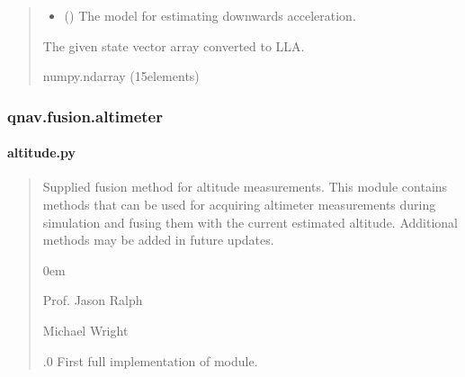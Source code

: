 \documentclass[letterpaper,10pt,english]{sphinxmanual}
\begin{document}
\begin{fulllineitems}
\begin{quote}
\begin{description}
\begin{itemize}
\item {} 
\sphinxAtStartPar
{} ({\hyperref[\detokenize{modules/gravity/base:qnav.gravity.base.GravityModel}]{}}) \textendash{} The model for estimating downwards acceleration.

\end{itemize}

\sphinxAtStartPar
The given state vector array converted to LLA.

\sphinxAtStartPar
numpy.ndarray (15\sphinxhyphen{}elements)

\end{description}\end{quote}

\end{fulllineitems}


\sphinxstepscope


\subsubsection{qnav.fusion.altimeter}
\label{\detokenize{modules/fusion/altimeter:module-qnav.fusion.altimeter}}\label{\detokenize{modules/fusion/altimeter:qnav-fusion-altimeter}}\label{\detokenize{modules/fusion/altimeter::doc}}

\paragraph{altitude.py}
\label{\detokenize{modules/fusion/altimeter:altitude-py}}\begin{quote}\begin{description}
\sphinxAtStartPar
Supplied fusion method for altitude measurements.
This module contains methods that can be used for acquiring altimeter
measurements during simulation and fusing them with the current
estimated altitude. Additional methods may be added in future updates.

\begin{DUlineblock}{0em}
\item[] Prof. Jason Ralph \sphinxhyphen{} 
\item[] Michael Wright \sphinxhyphen{} 
\end{DUlineblock}

.0 \sphinxhyphen{} First full implementation of module.

\end{description}\end{quote}
\end{document}
